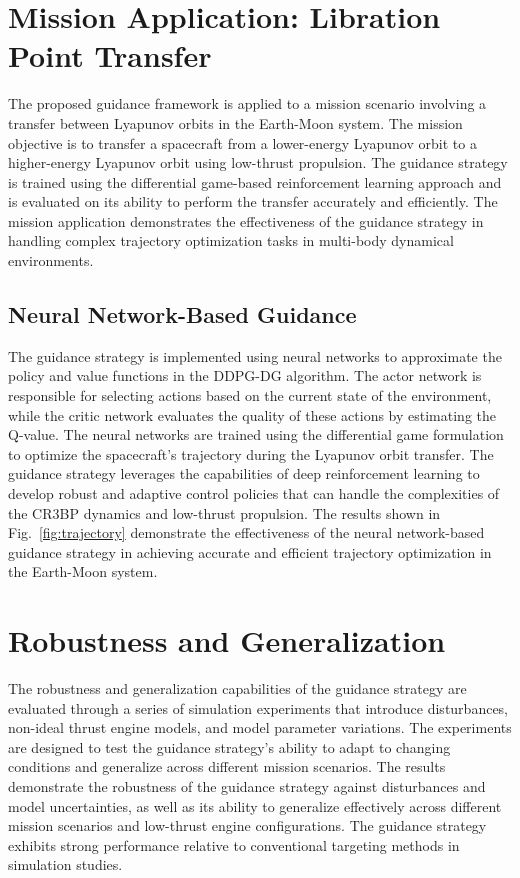 \documentclass[conference]{IEEEtran}
\begin{document}
\section{Mission Application: Libration Point Transfer}
The proposed guidance framework is applied to a mission scenario involving a transfer between Lyapunov orbits in the Earth-Moon system. The mission objective is to transfer a spacecraft from a lower-energy Lyapunov orbit to a higher-energy Lyapunov orbit using low-thrust propulsion. The guidance strategy is trained using the differential game-based reinforcement learning approach and is evaluated on its ability to perform the transfer accurately and efficiently. The mission application demonstrates the effectiveness of the guidance strategy in handling complex trajectory optimization tasks in multi-body dynamical environments.

\subsection{Neural Network-Based Guidance}
The guidance strategy is implemented using neural networks to approximate the policy and value functions in the DDPG-DG algorithm. The actor network is responsible for selecting actions based on the current state of the environment, while the critic network evaluates the quality of these actions by estimating the Q-value. The neural networks are trained using the differential game formulation to optimize the spacecraft's trajectory during the Lyapunov orbit transfer. The guidance strategy leverages the capabilities of deep reinforcement learning to develop robust and adaptive control policies that can handle the complexities of the CR3BP dynamics and low-thrust propulsion. The results shown in Fig.~\ref{fig:trajectory} demonstrate the effectiveness of the neural network-based guidance strategy in achieving accurate and efficient trajectory optimization in the Earth-Moon system.









\section{Robustness and Generalization}
The robustness and generalization capabilities of the guidance strategy are evaluated through a series of simulation experiments that introduce disturbances, non-ideal thrust engine models, and model parameter variations. The experiments are designed to test the guidance strategy's ability to adapt to changing conditions and generalize across different mission scenarios. The results demonstrate the robustness of the guidance strategy against disturbances and model uncertainties, as well as its ability to generalize effectively across different mission scenarios and low-thrust engine configurations. The guidance strategy exhibits strong performance relative to conventional targeting methods in simulation studies.
\end{document}
